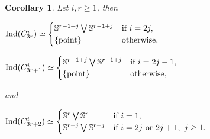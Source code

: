 \documentclass[12pt]{article}
\newtheorem{cor}[thm]{Corollary}
\numberwithin{thm}{section}
\theoremstyle{definition}
\newcommand{\bS}{\mathbb{S}}
\newcommand{\ind}{{\rm{Ind}}}
\begin{document}
\begin{cor}Let $i,r \geq 1$, then
	\begin{center}
		$ \ind(C_{3r}^i) \simeq 
		\begin{cases}
		\bS^{r-1+j} \bigvee \bS^{r-1+j} & \text{if } i=2j, \\
		\text{\rm \{\text{point}\}} & \text{otherwise}, \\
		\end{cases}$
	\end{center}
	\begin{center}
		$ \ind(C_{3r+1}^i) \simeq 
		\begin{cases}
		\bS^{r-1+j} \bigvee \bS^{r-1+j} & \text{if } i=2j-1, \\
		\text{\rm \{point\}} & \text{otherwise}, \\
		\end{cases}$
	\end{center}
	and
	\begin{center}
		$ \ind(C_{3r+2}^i) \simeq 
		\begin{cases}
		\bS^{r} \bigvee \bS^{r} & \text{if } i=1, \\
		\bS^{r+j} \bigvee \bS^{r+j} & \text{if } i=2j \text{ or } 2j+1, \ j \geq 1. \\
		\end{cases}$
	\end{center}
\end{cor}
\end{document}
